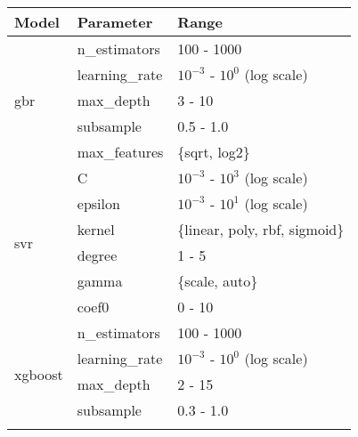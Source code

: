 \begin{table*}
\centering
\begin{tabular}{@{}l>{\ttfamily}lp{}@{}}
\toprule
\textbf{Model}                 & \textbf{Parameter}          & \textbf{Range}                           \\ \midrule
\multirow{5}{*}{\gls{gbr}}     & n\_estimators               & 100 - 1000                                \\ \cmidrule{2-3}
                               & learning\_rate              & $10^{-3}$ - $10^{0}$ (log scale)          \\ \cmidrule{2-3}
                               & max\_depth                  & 3 - 10                                    \\ \cmidrule{2-3}
                               & subsample                   & 0.5 - 1.0                                 \\ \cmidrule{2-3}
                               & max\_features               & \{sqrt, log2\}                            \\ \midrule
\multirow{6}{*}{\gls{svr}}     & C                           & $10^{-3}$ - $10^{3}$ (log scale)          \\ \cmidrule{2-3}
                               & epsilon                     & $10^{-3}$ - $10^{1}$ (log scale)          \\ \cmidrule{2-3}
                               & kernel                      & \{linear, poly, rbf, sigmoid\}            \\ \cmidrule{2-3}
                               & degree                      & 1 - 5                                     \\ \cmidrule{2-3}
                               & gamma                       & \{scale, auto\}                           \\ \cmidrule{2-3}
                               & coef0                       & 0 - 10                                    \\ \midrule
\multirow{8}{*}{\gls{xgboost}} & n\_estimators               & 100 - 1000                                \\ \cmidrule{2-3}
                               & learning\_rate              & $10^{-3}$ - $10^{0}$ (log scale)          \\ \cmidrule{2-3}
                               & max\_depth                  & 2 - 15                                    \\ \cmidrule{2-3}
                               & subsample                   & 0.3 - 1.0                                 \\ \cmidrule{2-3}

\end{tabular}
\end{table*}
